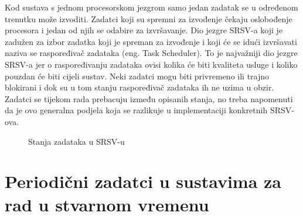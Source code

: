 \documentclass[../zavrsni.tex]{subfiles}
\begin{document}
Kod sustava s jednom procesorskom jezgrom samo jedan zadatak se u određenom trenutku može izvoditi. Zadatci koji su spremni za izvođenje
čekaju oslobođenje procesora i jedan od njih se odabire za izvršavanje.
Dio jezgre SRSV-a koji je zadužen za izbor zadatka koji je spreman za izvođenje i koji će se idući izvršavati naziva se raspoređivač 
zadataka (eng. Task Scheduler). To je najvažniji dio jezgre SRSV-a jer o raspoređivanju zadataka ovisi kolika će biti kvaliteta usluge i
koliko pouzdan će biti cijeli sustav.
Neki zadatci mogu biti privremeno ili trajno blokirani i dok su u tom stanju raspoređivač zadataka ih ne uzima u obzir.
Zadatci se tijekom rada prebacuju između opisanih stanja, no treba napomenuti da je ovo generalna podjela koja se razlikuje u 
implementaciji konkretnih SRSV-ova.

\begin{figure}[!htb]
    \caption{\label{fig:my-label} Stanja zadataka u SRSV-u}
  \end{figure}

\section{Periodični zadatci u sustavima za rad u stvarnom vremenu}
\end{document}
